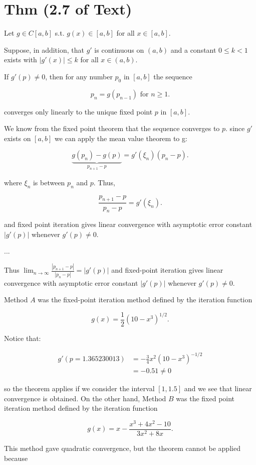 \section{Thm (2.7 of Text)}

Let $g\in C[a,b]$ s.t. $g(x) \in [a, b]$ for all $x \in [a, b]$.

Suppose, in addition, that $g'$ is continuous on $(a,b)$ and a constant
$0\leq k<1$ exists with $|g'(x)|\leq k$ for all $x\in (a,b)$.

If $g'(p) \neq 0$, then for any number $p_0$ in $[a,b]$ the sequence 

\[
  p_n = g(p_{n-1}) \text{ for } n\geq 1
.\]

converges only linearly to the unique fixed point $p$ in $[a,b]$.

\proof We know from the fixed point theorem that the sequence converges to $p$.
since $g'$ exists on $[a,b]$ we can apply the mean value theorem to g:

\[
\underbrace{g(p_n) - g(p)}_{p_{n+1} - p} = g'(\xi_n)(p_n - p)
.\]

where $\xi_n$ is between $p_n$ and $p$. Thus,

\[
  \frac{p_{n+1}-p}{p_n-p} = g'(\xi_n)
.\]

and fixed point iteration gives linear convergence with asymptotic error
constant $|g'(p)|$ whenever $g'(p) \neq 0$.

\proof...

Thus $\displaystyle \lim_{n\to\infty} \frac{|p_{n+1}-p|}{|p_n-p|} = |g'(p)|$
and fixed-point iteration gives linear convergence with asymptotic error 
constant $|g'(p)|$ whenever $g'(p) \neq 0$.

Method $A$ was the fixed-point iteration method defined by the iteration
function

\[
  g(x) = \frac{1}{2} (10-x^3)^{1/2}
.\]

Notice that:

\begin{align*}
g'(p=1.365230013)
&= -\frac{3}{4}x^2(10-x^3)^{-1/2} \\
&= -0.51 \neq 0
\end{align*}

so the theorem applies if we consider the interval $[1, 1.5]$ and we see that
linear convergence is obtained. On the other hand, Method $B$ was the fixed
point iteration method defined by the iteration function

\[
g(x) = x-\frac{x^3+4x^2-10}{3x^2+8x}
.\]

This method gave quadratic convergence, but the theorem cannot be applied 
because

